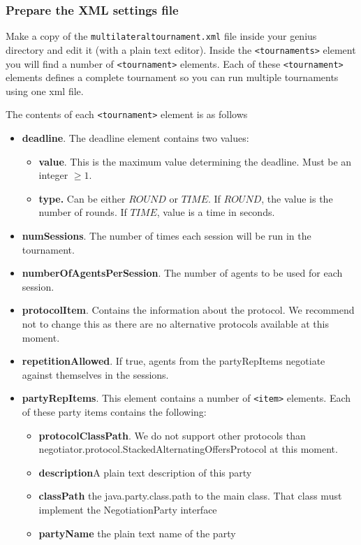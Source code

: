 \documentclass[]{article}
\begin{document}
\subsubsection{Prepare the XML settings file}
Make a copy of the \verb|multilateraltournament.xml| file inside your genius directory and edit it (with a plain text editor).  Inside the \verb|<tournaments>| element you will find a number of \verb|<tournament>| elements. Each of these \verb|<tournament>| elements defines a complete tournament so you can run multiple tournaments using one xml file.

The contents of each \verb|<tournament>| element is as follows 

\begin{itemize}
    \item \textbf{deadline}. The deadline element contains two values:
      \begin{itemize}
        \item \textbf{value}. This is the maximum value determining the deadline. Must be an integer $\ge 1$.
        \item \textbf{type.} Can be either $ROUND$ or $TIME$. If $ROUND$, the value is the number of rounds. If $TIME$, value is a time in seconds.
      \end{itemize}
      
    \item \textbf{numSessions}. The number of times each session will be run in the tournament. 

    \item \textbf{numberOfAgentsPerSession}. The number of agents to be used for each session.
      
    \item \textbf{protocolItem}. Contains the information about the protocol. We recommend not to change this as there are no alternative protocols available at this moment.

    \item  \textbf{repetitionAllowed}. If true, agents from the partyRepItems negotiate against themselves in the sessions. 

    \item \textbf{partyRepItems}. This element contains a number of \verb|<item>| elements. Each of these party items contains the following:
      \begin{itemize}
        \item \textbf{protocolClassPath}. We do not support other protocols than negotiator.protocol.StackedAlternatingOffersProtocol at this moment.
        \item \textbf{description}A plain text description of this party
        \item \textbf{classPath} the java.party.class.path to the main class. That class must implement the NegotiationParty interface
        \item \textbf{partyName} the plain text name of the party
      \end{itemize}


\end{itemize}
\end{document}

